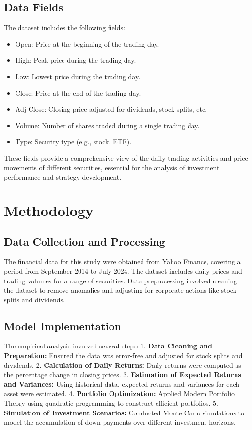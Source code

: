 \subsection{Data Fields}
The dataset includes the following fields:
\begin{itemize}
    \item Open: Price at the beginning of the trading day.
    \item High: Peak price during the trading day.
    \item Low: Lowest price during the trading day.
    \item Close: Price at the end of the trading day.
    \item Adj Close: Closing price adjusted for dividends, stock splits, etc.
    \item Volume: Number of shares traded during a single trading day.
    \item Type: Security type (e.g., stock, ETF).
\end{itemize}

These fields provide a comprehensive view of the daily trading activities and price movements of different securities, essential for the analysis of investment performance and strategy development.

\section{Methodology}
\subsection{Data Collection and Processing}
The financial data for this study were obtained from Yahoo Finance, covering a period from September 2014 to July 2024. The dataset includes daily prices and trading volumes for a range of securities. Data preprocessing involved cleaning the dataset to remove anomalies and adjusting for corporate actions like stock splits and dividends.

\subsection{Model Implementation}
The empirical analysis involved several steps:
1. \textbf{Data Cleaning and Preparation:} Ensured the data was error-free and adjusted for stock splits and dividends.
2. \textbf{Calculation of Daily Returns:} Daily returns were computed as the percentage change in closing prices.
3. \textbf{Estimation of Expected Returns and Variances:} Using historical data, expected returns and variances for each asset were estimated.
4. \textbf{Portfolio Optimization:} Applied Modern Portfolio Theory using quadratic programming to construct efficient portfolios.
5. \textbf{Simulation of Investment Scenarios:} Conducted Monte Carlo simulations to model the accumulation of down payments over different investment horizons.


